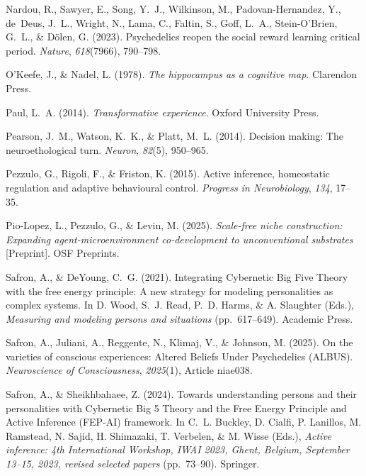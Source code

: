 \documentclass[12pt,fleqn]{article}
\begin{document}
\begin{thebibliography}{}
  Nardou, R., Sawyer, E., Song, Y.~J., Wilkinson, M., Padovan-Hernandez, Y., de~Deus, J.~L., Wright, N., Lama, C., Faltin, S., Goff, L.~A., Stein-O'Brien, G.~L., \& D\"olen, G. (2023).
  Psychedelics reopen the social reward learning critical period.
  \emph{Nature}, \emph{618}(7966), 790--798.

  O'Keefe, J., \& Nadel, L. (1978).
  \emph{The hippocampus as a cognitive map}.
  Clarendon Press.

  Paul, L.~A. (2014).
  \emph{Transformative experience}.
  Oxford University Press.

  Pearson, J.~M., Watson, K.~K., \& Platt, M.~L. (2014).
  Decision making: The neuroethological turn.
  \emph{Neuron}, \emph{82}(5), 950--965.

  Pezzulo, G., Rigoli, F., \& Friston, K. (2015).
  Active inference, homeostatic regulation and adaptive behavioural control.
  \emph{Progress in Neurobiology}, \emph{134}, 17--35.

  Pio-Lopez, L., Pezzulo, G., \& Levin, M. (2025).
  \emph{Scale-free niche construction: Expanding agent-microenvironment co-development to unconventional substrates} [Preprint].
  OSF Preprints.

  Safron, A., \& DeYoung, C.~G. (2021).
  Integrating Cybernetic Big Five Theory with the free energy principle: A new strategy for modeling personalities as complex systems.
  In D. Wood, S.~J. Read, P.~D. Harms, \& A. Slaughter (Eds.), \emph{Measuring and modeling persons and situations} (pp.~617--649).
  Academic Press.

  Safron, A., Juliani, A., Reggente, N., Klimaj, V., \& Johnson, M. (2025).
  On the varieties of conscious experiences: Altered Beliefs Under Psychedelics (ALBUS).
  \emph{Neuroscience of Consciousness}, \emph{2025}(1), Article niae038.

  Safron, A., \& Sheikhbahaee, Z. (2024).
  Towards understanding persons and their personalities with Cybernetic Big 5 Theory and the Free Energy Principle and Active Inference (FEP-AI) framework.
  In C.~L. Buckley, D. Cialfi, P. Lanillos, M. Ramstead, N. Sajid, H. Shimazaki, T. Verbelen, \& M. Wisse (Eds.), \emph{Active inference: 4th International Workshop, IWAI 2023, Ghent, Belgium, September 13--15, 2023, revised selected papers} (pp.~73--90).
  Springer.


\end{thebibliography}
\end{document}
